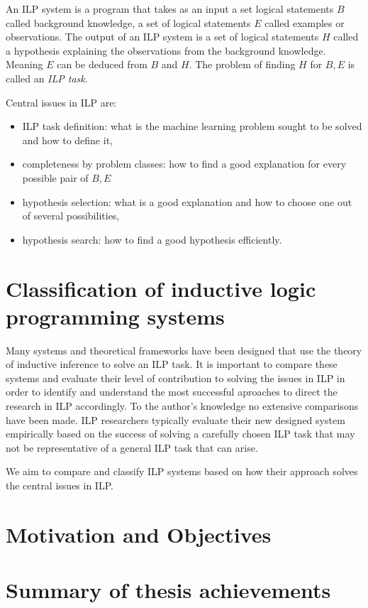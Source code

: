 An ILP system is a program that takes as an input a set logical statements $B$ called background knowledge, a set of logical statements $E$ called examples or observations. The output of an ILP system is a set of logical statements $H$ called a hypothesis explaining the observations from the background knowledge. Meaning $E$ can be deduced from $B$ and $H$. The problem of finding $H$ for $B, E$ is called an \emph{ILP task}.

Central issues in ILP are:
\begin{itemize}
\item ILP task definition: what is the machine learning problem sought to be solved and how to define it,
\item completeness by problem classes: how to find a good explanation for every possible pair of $B, E$
\item hypothesis selection: what is a good explanation and how to choose one out of several possibilities,
\item hypothesis search: how to find a good hypothesis efficiently.
\end{itemize}

\section{Classification of inductive logic programming systems}
Many systems and theoretical frameworks have been designed that use the theory of inductive inference to solve an ILP task. It is important to compare these systems and evaluate their level of contribution to solving the issues in ILP in order to identify and understand the most successful aproaches to direct the research in ILP accordingly. To the author's knowledge no extensive comparisons have been made. ILP researchers typically evaluate their new designed system empirically based on the success of solving a carefully chosen ILP task that may not be representative of a general ILP task that can arise.

We aim to compare and classify ILP systems based on how their approach solves the central issues in ILP.

\section{Motivation and Objectives}

\section{Summary of thesis achievements}

